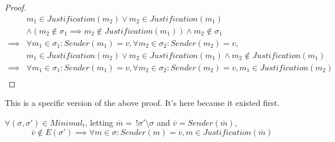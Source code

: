\begin{proof}
\begin{align}
          &m_1 \in Justification(m_2) \lor m_2 \in Justification(m_1) \\
          &\land (m_2 \notin \sigma_1 \implies m_2 \notin Justification(m_1)) \land m_2 \notin \sigma_1 \\
  \implies&\forall m_1 \in \sigma_1: Sender(m_1) = v, \forall m_2 \in \sigma_2: Sender(m_2) = v, \\
          &m_1 \in Justification(m_2) \lor m_2 \in Justification(m_1) \land m_2 \notin Justification(m_1) \\
  \implies&\forall m_1 \in \sigma_1: Sender(m_1) = v, \forall m_2 \in \sigma_2: Sender(m_2) = v, m_1 \in Justification(m_2)\\
  \end{align}
\end{proof}

\iffalse
This is a specific version of the above proof. It's here because it existed first.
\begin{lemma}
$\forall (\sigma, \sigma') \in Minimal_t$, letting $\overline{m} =~!\sigma'\setminus\sigma$ and $\overline{v} = Sender(\overline{m})$,
$$
\overline{v} \notin E(\sigma') \implies \forall m \in \sigma: Sender(m) = \overline{v}, m \in Justification(\overline{m})
$$
\end{lemma}

